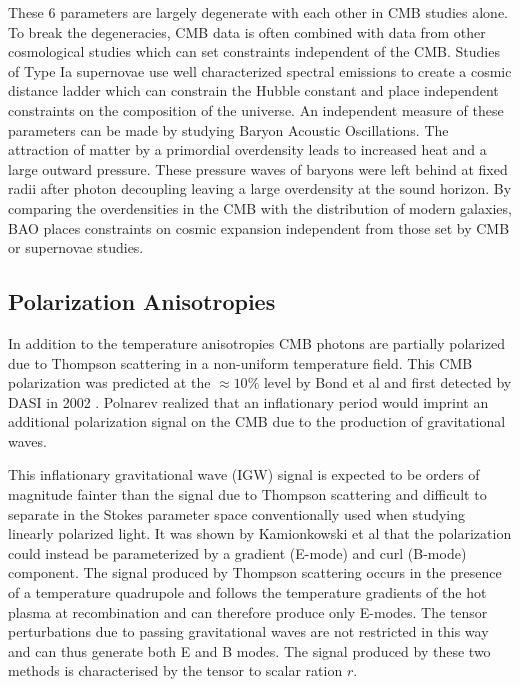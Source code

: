 \documentclass[12pt]{article}
\begin{document}
These 6 parameters are largely degenerate with each other in CMB studies
alone. To break the degeneracies, CMB data is often combined with data from
other cosmological studies which can set constraints independent of the CMB.
Studies of Type Ia supernovae use well characterized spectral emissions to create a
cosmic distance ladder which can constrain the Hubble constant and place
independent constraints on the composition of the universe. An independent
measure of these parameters can be made by studying Baryon Acoustic
Oscillations. The attraction of matter by a primordial overdensity leads to
increased heat and a large outward pressure. These pressure waves of baryons
were left behind at fixed radii after photon decoupling leaving a large
overdensity at the sound horizon. By comparing the overdensities in the CMB
with the distribution of modern galaxies, BAO places constraints on cosmic
expansion independent from those set by CMB or supernovae studies.






\subsection{Polarization Anisotropies}
In addition to the temperature anisotropies CMB photons are partially
polarized due to Thompson scattering in a non-uniform temperature field. This
CMB polarization was predicted at the $\approx 10\%$ level by Bond et al
\cite{cite:Bond} and first detected by DASI in 2002 \cite{cite:DASI}. Polnarev
\cite{cite:Polnarev} realized that an inflationary period would imprint an
additional polarization signal on the CMB due to the production of
gravitational waves. 

This inflationary gravitational wave (IGW) signal is expected to be orders of
magnitude fainter than the signal due to Thompson scattering and difficult to
separate in the Stokes parameter space conventionally used when studying
linearly polarized light. It was shown by Kamionkowski et al
\cite{cite:Kamionkowski} that the polarization could instead be parameterized
by a gradient (E-mode) and curl (B-mode) component. The signal produced by
Thompson scattering occurs in the presence of a temperature quadrupole and
follows the temperature gradients of the hot plasma at recombination and can
therefore produce only E-modes. The tensor perturbations due to passing
gravitational waves are not restricted in this way and can thus generate both
E and B modes. The signal produced by these two methods is characterised by
the tensor to scalar ration $r$. 
\end{document}
